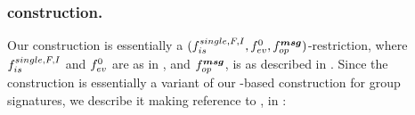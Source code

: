 
\subsubsection{\CUASGSMDO construction.} %
Our \CUASGSMDO construction is essentially a $(f_{is}^{single,F,I},f_{ev}^0,
f_{op}^{\boldsymbol{msg}})$-\CUASGen restriction, where $f_{is}^{single,F,I}$ and
$f_{ev}^0$ are as in , and $f_{op}^{\boldsymbol{msg}}$, is as
described in . Since the construction is essentially a variant
of our \CUASGen-based construction for group signatures, we describe it making
reference to \CUASGS, in :

